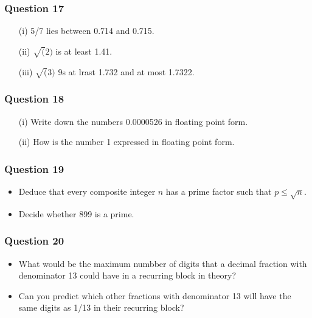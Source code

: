 \documentclass[]{report}
\begin{document}
\subsubsection*{Question 17}
\begin{enumerate}
\item[(i)] 5/7 lies between 0.714 and 0.715.
\item[(ii)] $\sqrt(2)$ is at least 1.41.
\item[(iii)] $\sqrt(3)$  9s at lrast 1.732 and at most 1.7322.
\end{enumerate}


\subsubsection*{Question 18}
\begin{itemize}
\item[(i)] Write down the numbers 0.0000526 in floating point form.
\item[(ii)] How is the number 1 expressed in floating point form.
\end{itemize}


\subsubsection*{Question 19}
\begin{itemize}
\item Deduce that every composite integer $n$ has a prime factor such that $p \leq \sqrt{n}$.
\item Decide whether 899 is a prime.
\end{itemize}

\subsubsection*{Question 20}

\begin{itemize}
\item What would be the maximum numbber of digits that a decimal fraction with denominator 13 
could have in a recurring block in theory?

\item Can you predict which other fractions with denominator 13 will have the same digits as 1/13 in their recurring block?
\end{itemize}
\end{document}
